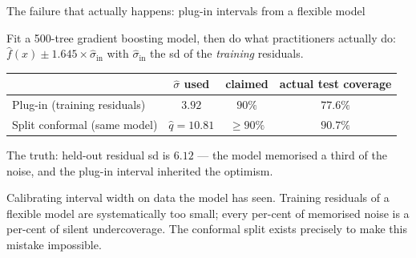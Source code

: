 \documentclass[aspectratio=169,11pt]{beamer}
\begin{document}
\begin{frame}{The failure that actually happens: plug-in intervals from a flexible model}
  \footnotesize
  \begin{numexample}
    Fit a 500-tree gradient boosting model, then do what practitioners actually do:
    $\hat f(x) \pm 1.645 \times \hat\sigma_{\text{in}}$ with $\hat\sigma_{\text{in}}$
    the sd of the \emph{training} residuals.
    \begin{center}
    \footnotesize
    \begin{tabular}{@{}lccc@{}}
      \toprule
      & $\hat\sigma$ used & claimed & actual test coverage \\
      \midrule
      Plug-in (training residuals) & $3.92$ & $90\%$ & $\mathbf{77.6\%}$ \\
      Split conformal (same model) & $\hat q = 10.81$ & $\ge 90\%$ & $90.7\%$ \\
      \bottomrule
    \end{tabular}
    \end{center}
    The truth: held-out residual sd is $6.12$ --- the model memorised a third of the
    noise, and the plug-in interval inherited the optimism.
  \end{numexample}
  \begin{mistake}
    Calibrating interval width on data the model has seen. Training residuals of a
    flexible model are systematically too small; every per-cent of memorised noise is
    a per-cent of silent undercoverage. The conformal split exists precisely to make
    this mistake impossible.
  \end{mistake}
\end{frame}
\end{document}
